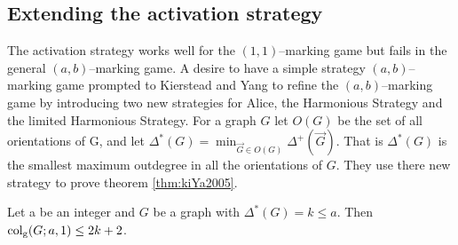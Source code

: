 \subsection{Extending the activation strategy}

The activation strategy works well for the $(1,1)$--marking game but fails in the general $(a,b)$--marking game. A desire to have a simple strategy $(a,b)$--marking game prompted to Kierstead and Yang to refine the $(a,b)$--marking game by introducing two new strategies for Alice, the Harmonious Strategy and the limited Harmonious Strategy.  For a graph $G$ let $O(G)$ be the set of all orientations of G, and let $\Delta^*(G)=\min_{\vec{G}\in O(G)}\Delta^+(\vec{G})$. That is $\Delta^*(G)$ is the smallest maximum outdegree in all the orientations of $G$. They use there new strategy to prove theorem \ref{thm:kiYa2005}.

\begin{theorem}\label{thm:kiYa2005}
    Let a be an integer and $G$ be a graph with $\Delta^*(G) = k\leq a$. Then
    $\operatorname{col_g}(G;a,1) \leq 2k + 2$.
\end{theorem}

